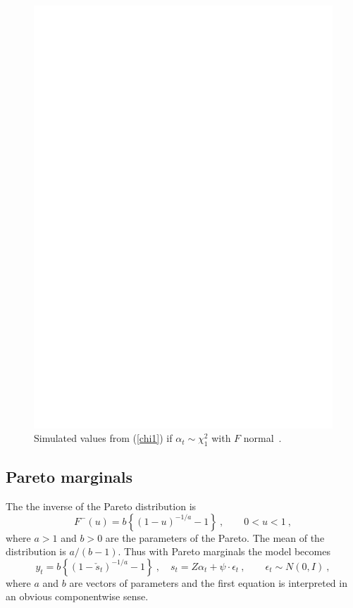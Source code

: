 \documentclass[a4paper,12pt]{article}
\newcommand{\eps}{\epsilon}
\newcommand{\eref}[1]{(\ref{#1})}
\begin{document}
\begin{figure}[htb]
\centering
\includegraphics{fig3.eps}
\caption{Simulated values from \eref{chi1} if $\alpha_t\sim \chi^2_1$ with $F$ normal\ .}\label{fig3}
\end{figure}

\subsection{Pareto marginals}

The the inverse of the Pareto distribution is  
$$
F^-(u)= b\left\{(1-u)^{-1/a}-1\right\}\ ,\qquad 0<u<1\ ,
$$
where $a>1$ and $b>0$ are the parameters of the Pareto.  The mean of the distribution is $a/(b-1)$.  Thus with Pareto marginals the model becomes
$$
y_t=b\left\{(1-\check s_t)^{-1/a}-1\right\}\ ,\quad s_t=Z\alpha_t+\psi\cdot\eps_t\ , \qquad \eps_t\sim N(0,I)\ ,
$$
where $a$ and $b$ are vectors of parameters and the first equation is interpreted in an obvious componentwise sense.
\end{document}
